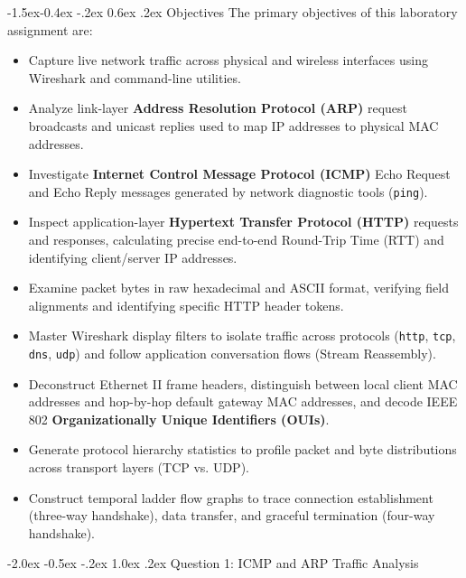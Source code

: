 \documentclass[11pt,a4paper]{article}
\makeatletter
\renewcommand\section{\@startsection {section}{1}{\z@}%
  {-2.0ex \@plus -0.5ex \@minus -.2ex}%
  {1.0ex \@plus .2ex}%
  {\normalfont\Large\bfseries}}
\renewcommand\subsection{\@startsection{subsection}{2}{\z@}%
  {-1.5ex\@plus -0.4ex \@minus -.2ex}%
  {0.6ex \@plus .2ex}%
  {\normalfont\large\bfseries}}
\makeatother
\begin{document}
\subsection{Objectives}
The primary objectives of this laboratory assignment are:
\begin{itemize}
  \item Capture live network traffic across physical and wireless interfaces using Wireshark and command-line utilities.
  \item Analyze link-layer \textbf{Address Resolution Protocol (ARP)} request broadcasts and unicast replies used to map IP addresses to physical MAC addresses.
  \item Investigate \textbf{Internet Control Message Protocol (ICMP)} Echo Request and Echo Reply messages generated by network diagnostic tools (\texttt{ping}).
  \item Inspect application-layer \textbf{Hypertext Transfer Protocol (HTTP)} requests and responses, calculating precise end-to-end Round-Trip Time (RTT) and identifying client/server IP addresses.
  \item Examine packet bytes in raw hexadecimal and ASCII format, verifying field alignments and identifying specific HTTP header tokens.
  \item Master Wireshark display filters to isolate traffic across protocols (\texttt{http}, \texttt{tcp}, \texttt{dns}, \texttt{udp}) and follow application conversation flows (Stream Reassembly).
  \item Deconstruct Ethernet II frame headers, distinguish between local client MAC addresses and hop-by-hop default gateway MAC addresses, and decode IEEE 802 \textbf{Organizationally Unique Identifiers (OUIs)}.
  \item Generate protocol hierarchy statistics to profile packet and byte distributions across transport layers (TCP vs. UDP).
  \item Construct temporal ladder flow graphs to trace connection establishment (three-way handshake), data transfer, and graceful termination (four-way handshake).
\end{itemize}

\section{Question 1: ICMP and ARP Traffic Analysis}
\end{document}
